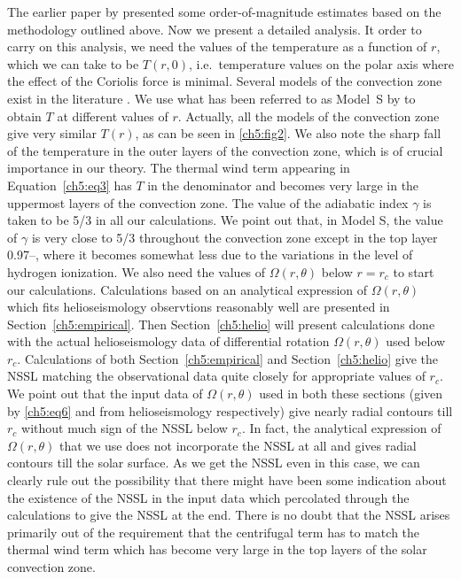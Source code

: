 The earlier paper by \citet{Choudhuri2021a} presented some order-of-magnitude estimates based on the methodology outlined above.  Now we present a detailed analysis. It order to carry on this analysis, we need the values of the temperature as a function of $r$, which we can take to be $T(r, 0)$, i.e.\ temperature values on the polar axis where the effect of the Coriolis force is minimal.  Several models of the convection zone exist in the literature  \citep{Spruit1974, Bahcall1988, Dalsgaard1996, Bahcall2004}. We use what has been referred to as Model~S by \citet{Dalsgaard1996} to obtain $T$ at different values of $r$.
Actually, all the models of the convection zone give very similar $T(r)$, as can be seen in \autoref{ch5:fig2}.
We also note the sharp fall of the temperature in the outer layers of the convection zone, 
which is of crucial importance in our theory. The thermal wind term appearing in Equation~\ref{ch5:eq3} has $T$ in the denominator and becomes very large in the uppermost layers of the convection zone.  The value of the adiabatic
index $\gamma$ is taken to be 5/3 in all our calculations.  We point out that, in Model S, the value of $\gamma$ is very close to 5/3 throughout the convection zone except in the top layer 0.97\Rsun--\Rsun, where it becomes somewhat less due to the variations in the level of hydrogen ionization. We also need the values of $\Omega (r, \theta)$ below $r = r_c$ to start our calculations.  Calculations based on an analytical expression of  $\Omega (r, \theta)$ which fits helioseismology observtions reasonably well are presented in Section~\ref{ch5:empirical}.  Then Section~\ref{ch5:helio} will present calculations done with the actual helioseismology data of differential rotation $\Omega (r, \theta)$ used below $r_c$.  Calculations of both Section~\ref{ch5:empirical} and Section~\ref{ch5:helio} give the NSSL matching the observational data quite closely for appropriate values of $r_c$.  We point out that the input data of $\Omega (r, \theta)$ used in both these
sections (given by \autoref{ch5:eq6} and from helioseismology respectively) give nearly radial contours till $r_c$ without much sign of the NSSL below $r_c$.  In fact, the analytical expression of $\Omega (r, \theta)$ that we use does not incorporate the NSSL at all and gives radial contours till the solar surface.  As we get the NSSL even in this case, we can clearly rule out the possibility that there might have been some indication about the existence of the NSSL in the input data which percolated through the calculations to give the NSSL at the end.  There is no doubt that the NSSL arises primarily out of the requirement that the centrifugal term has to match the thermal wind term which has become very large in the top layers of the solar convection zone. 

